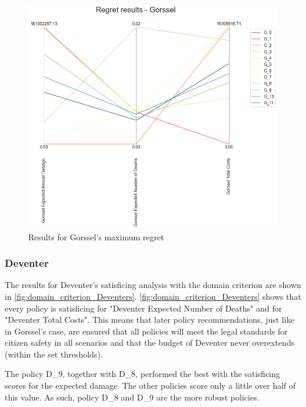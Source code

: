 \begin{figure}[H]
\begin{minipage}[b]{0.4\textwidth}
    \includegraphics[width=1.15\textwidth]{report/figures/results/regret_figure_Gorssel.png}
    \caption{Results for Gorssel's maximum regret}
    \label{fig:regret_gorssel}
  \end{minipage}
\end{figure}




\subsubsection{Deventer}
The results for Deventer's satisficing analysis with the domain criterion are shown in  \autoref{fig:domain_criterion_Deventers}. 
\autoref{fig:domain_criterion_Deventers} shows that every policy is satisficing for "Deventer Expected Number of Deaths" and for "Deventer Total Costs". This means that later policy recommendations, just like in Gorssel's case, are ensured that all policies will meet the legal standards for citizen safety in all scenarios and that the budget of Deventer never overextends (within the set thresholds). 

The policy D\_9, together with D\_8, performed the best with the satisficing scores for the expected damage. The other policies score only a little over half of this value. As such, policy D\_8 and D\_9 are the more robust policies. \newline 

